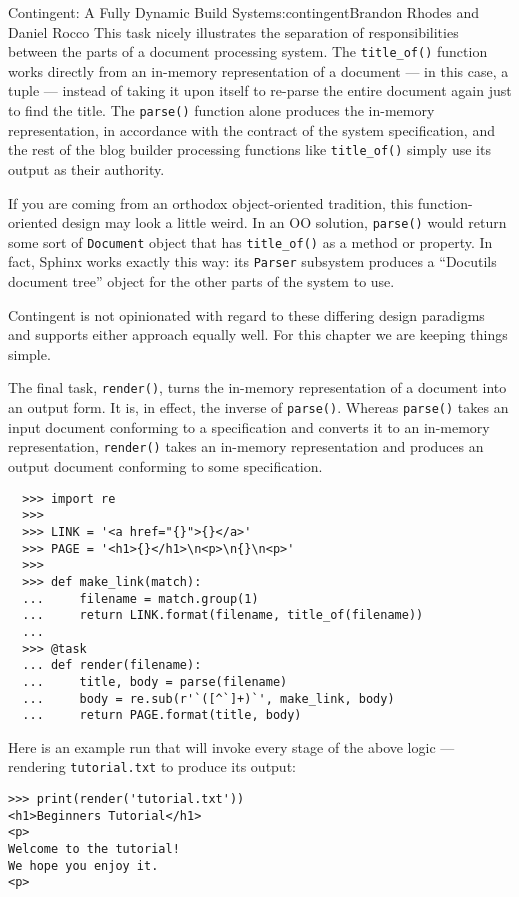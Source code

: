\begin{aosachapter}{Contingent: A Fully Dynamic Build System}{s:contingent}{Brandon Rhodes and Daniel Rocco}
This task nicely illustrates the separation of responsibilities between
the parts of a document processing system. The \texttt{title\_of()}
function works directly from an in-memory representation of a document
--- in this case, a tuple --- instead of taking it upon itself to
re-parse the entire document again just to find the title. The
\texttt{parse()} function alone produces the in-memory representation,
in accordance with the contract of the system specification, and the
rest of the blog builder processing functions like \texttt{title\_of()}
simply use its output as their authority.

If you are coming from an orthodox object-oriented tradition, this
function-oriented design may look a little weird. In an OO solution,
\texttt{parse()} would return some sort of \texttt{Document} object that
has \texttt{title\_of()} as a method or property. In fact, Sphinx works
exactly this way: its \texttt{Parser} subsystem produces a ``Docutils
document tree'' object for the other parts of the system to use.

Contingent is not opinionated with regard to these differing design
paradigms and supports either approach equally well. For this chapter we
are keeping things simple.

The final task, \texttt{render()}, turns the in-memory representation of
a document into an output form. It is, in effect, the inverse of
\texttt{parse()}. Whereas \texttt{parse()} takes an input document
conforming to a specification and converts it to an in-memory
representation, \texttt{render()} takes an in-memory representation and
produces an output document conforming to some specification.

\begin{verbatim}
  >>> import re
  >>>
  >>> LINK = '<a href="{}">{}</a>'
  >>> PAGE = '<h1>{}</h1>\n<p>\n{}\n<p>'
  >>>
  >>> def make_link(match):
  ...     filename = match.group(1)
  ...     return LINK.format(filename, title_of(filename))
  ...
  >>> @task
  ... def render(filename):
  ...     title, body = parse(filename)
  ...     body = re.sub(r'`([^`]+)`', make_link, body)
  ...     return PAGE.format(title, body)
\end{verbatim}

Here is an example run that will invoke every stage of the above logic
--- rendering \texttt{tutorial.txt} to produce its output:

\begin{verbatim}
>>> print(render('tutorial.txt'))
<h1>Beginners Tutorial</h1>
<p>
Welcome to the tutorial!
We hope you enjoy it.
<p>
\end{verbatim}


\end{aosachapter}
